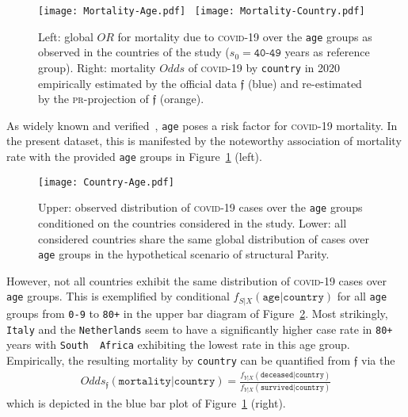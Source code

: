 \documentclass[10pt]{article}
\newcommand{\equ}[1]{\begin{gather} #1 \end{gather}}
\newcommand{\prob}[1]{\mathfrak{#1}}
\begin{document}
%
\begin{figure}[t]
    \centering
    \texttt{[image: Mortality-Age.pdf]}~
    \texttt{[image: Mortality-Country.pdf]}
    \caption{Left: global $OR$ for {mortality} due to \textsc{covid}-19 over the \texttt{age} groups as observed in the countries of the study ($s_0=\texttt{40-49}$ years as reference group).
    Right: {mortality} $Odds$ of \textsc{covid}-19 by \texttt{country} in 2020 empirically estimated by the official data $\prob f$ (blue) and re-estimated  by the \textsc{pr}-projection of $\prob f$ (orange). }
    \label{fig:Mortality-Age_Mortality-Country}
\end{figure}
%
As widely known and verified~\cite{RomeroStarkee006434}, \texttt{age} poses a risk factor for \textsc{covid}-19 mortality. In the present dataset, this is manifested by the noteworthy association of {mortality} rate  with the provided \texttt{age} groups in  Figure~\ref{fig:Mortality-Age_Mortality-Country} (left).
%
\begin{figure}[t]
    \centering
    \texttt{[image: Country-Age.pdf]}
    \caption{Upper: observed distribution of \textsc{covid}-19 cases over the \texttt{age} groups conditioned on the countries considered in the study. Lower: all considered countries share the same global distribution of cases over \texttt{age} groups in the hypothetical scenario of structural Parity.}
    \label{fig:Country-Age}
\end{figure}
%
However, not all countries exhibit the same distribution of \textsc{covid}-19 cases over \texttt{age} groups. This is exemplified by conditional $ f_{S\vert X}(\texttt{age}\vert\texttt{country})$ for all \texttt{age} groups from \texttt{0-9} to \texttt{80+} in the upper bar diagram of Figure~\ref{fig:Country-Age}. Most strikingly, \texttt{Italy} and the \texttt{Netherlands} seem to have a significantly higher case rate in \texttt{80+} years with \texttt{South\,\,Africa} exhibiting the lowest rate  in this age group. 
%
Empirically, the resulting {mortality} by \texttt{country} can be quantified from $\prob f$ via the
\equ{
\label{eq:COVID19:OddsMortality}
Odds_{\prob f}(\texttt{mortality}\vert\texttt{country}) = \frac{f_{Y\vert X}(\texttt{deceased}\vert\texttt{country})}{f_{Y\vert X}(\texttt{survived}\vert\texttt{country})}
}
which is depicted in the blue bar plot of Figure~\ref{fig:Mortality-Age_Mortality-Country} (right).
\end{document}

